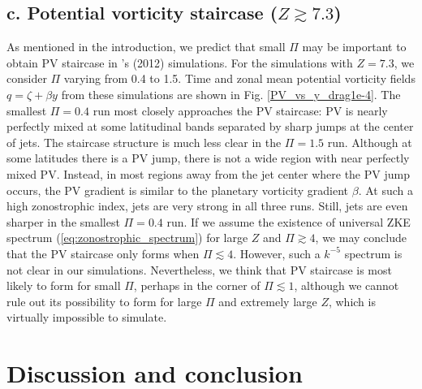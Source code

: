 \documentclass{ametsoc}
\begin{document}
\subsection*{c. Potential vorticity staircase ($Z\apprge7.3$)}

As mentioned in the introduction, we predict that small $\Pi$ may be
important to obtain PV staircase in \citeauthor{Scott2012}'s (2012) simulations.
For the simulations with $Z=7.3$, we consider $\Pi$ varying from 0.4 to 1.5.
Time and zonal mean potential vorticity fields $q=\zeta+\beta y$
from these simulations are shown in Fig. \ref{PV_vs_y_drag1e-4}.
The smallest $\Pi=0.4$ run most closely approaches the PV staircase: 
PV is nearly perfectly mixed at some latitudinal bands 
separated by sharp jumps at the center of jets. 
The staircase structure is much less clear in the $\Pi=1.5$ run.
Although at some latitudes there is a PV jump, there is not a wide
region with near perfectly mixed PV. Instead, in most regions away from
the jet center where the PV jump occurs, the PV gradient is similar to the
planetary vorticity gradient $\beta$. At such a high zonostrophic index, 
jets are very strong in all three runs. Still, jets are even sharper 
in the smallest $\Pi=0.4$ run. If we assume the existence
of universal ZKE spectrum (\ref{eq:zonostrophic_spectrum}) for large $Z$
and $\Pi\apprge 4$, we may conclude that the PV staircase only forms 
when $\Pi\apprle4$. However, such a $k^{-5}$ spectrum is not clear
in our simulations. Nevertheless, we think that PV staircase 
is most likely to form for small $\Pi$, perhaps in the corner of $\Pi\apprle1$,
although we cannot rule out its possibility to form for large $\Pi$ and
extremely large $Z$, which is virtually impossible to simulate.


\section{Discussion and conclusion}
\end{document}
